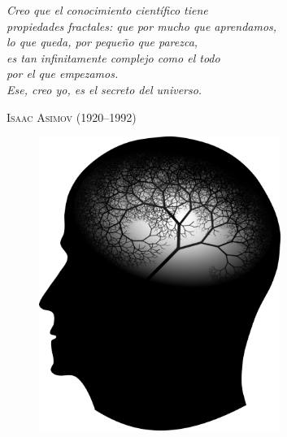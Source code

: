 \documentclass[12pt,letterpaper]{book}
\begin{document}
\newpage


\thispagestyle{empty}

\tableofcontents
\newpage

\listoffigures
\listoftables
\newpage


\begin{center}\textit{
Creo que el conocimiento científico tiene \\
propiedades fractales: que por mucho que aprendamos,  \\
lo que queda, por pequeño que parezca,  \\
es tan infinitamente complejo como el todo \\ 
por el que empezamos. \\
Ese, creo yo, es el secreto del universo.} 
\vspace{1em}
\end{center}
\begin{flushright}
\textsc{Isaac Asimov (1920--1992)}
\end{flushright}

\begin{figure}
\centering
\includegraphics[width = 0.7\textwidth]{frase.png} 
\end{figure}
\end{document}
